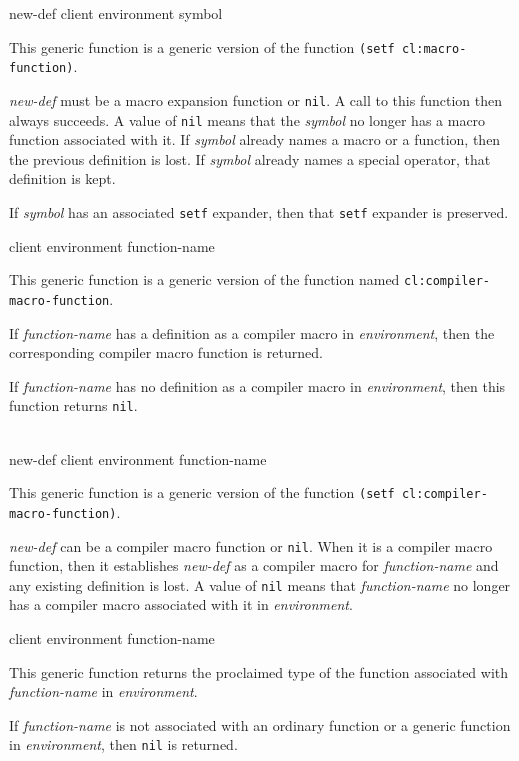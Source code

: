  {new-def client environment symbol}

This generic function is a generic version of the \commonlisp{}
function \texttt{(setf cl:macro-function)}.

\textit{new-def} must be a macro expansion function or \texttt{nil}.
A call to this function then always succeeds.  A value of \texttt{nil}
means that the \textit{symbol} no longer has a macro function
associated with it.  If \textit{symbol} already names a macro or a
function, then the previous definition is lost.  If \textit{symbol}
already names a special operator, that definition is kept.

If \textit{symbol} has an associated \texttt{setf} expander, then that
\texttt{setf} expander is preserved.

 {client environment function-name}

This generic function is a generic version of the \commonlisp{}
function named \texttt{cl:compiler-macro-function}.

If \textit{function-name} has a definition as a compiler macro in
\textit{environment}, then the corresponding compiler macro function
is returned.

If \textit{function-name} has no definition as a compiler macro in
\textit{environment}, then this function returns \texttt{nil}.

\\
{new-def client environment function-name}

This generic function is a generic version of the \commonlisp{}
function \texttt{(setf cl:compiler-macro-function)}.

\textit{new-def} can be a compiler macro function or \texttt{nil}.
When it is a compiler macro function, then it establishes
\textit{new-def} as a compiler macro for \textit{function-name} and
any existing definition is lost.  A value of \texttt{nil} means that
\textit{function-name} no longer has a compiler macro associated with
it in \textit{environment}.

 {client environment function-name}

This generic function returns the proclaimed type of the function
associated with \textit{function-name} in \textit{environment}.

If \textit{function-name} is not associated with an ordinary function
or a generic function in \textit{environment}, then \texttt{nil} is
returned.

